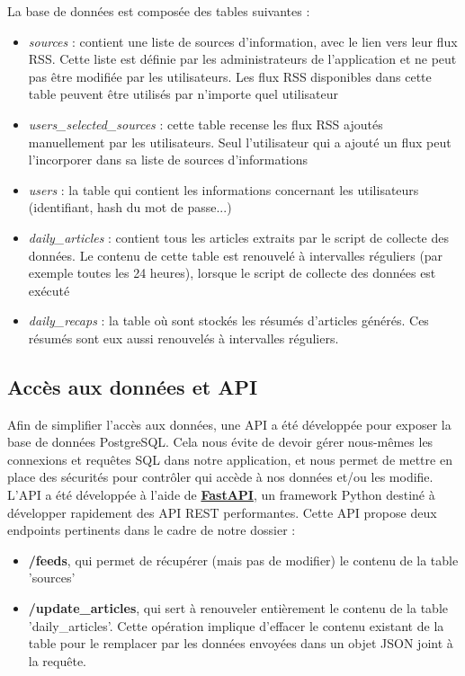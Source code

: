 \documentclass[french]{article}
\begin{document}
    La base de données est composée des tables suivantes :
    \begin{itemize}
        \item \textit{sources} : contient une liste de sources d'information, avec le lien vers leur flux RSS. Cette liste est définie par les administrateurs de l'application et ne peut pas être modifiée par les utilisateurs. Les flux RSS disponibles dans cette table peuvent être utilisés par n'importe quel utilisateur
        \item \textit{users\_selected\_sources} : cette table recense les flux RSS ajoutés manuellement par les utilisateurs. Seul l'utilisateur qui a ajouté un flux peut l'incorporer dans sa liste de sources d'informations
        \item \textit{users} : la table qui contient les informations concernant les utilisateurs (identifiant, hash du mot de passe...)
        \item \textit{daily\_articles} : contient tous les articles extraits par le script de collecte des données. Le contenu de cette table est renouvelé à intervalles réguliers (par exemple toutes les 24 heures), lorsque le script de collecte des données est exécuté
        \item \textit{daily\_recaps} : la table où sont stockés les résumés d'articles générés. Ces résumés sont eux aussi renouvelés à intervalles réguliers.
    \end{itemize}

    \subsection{Accès aux données et API}
    
    Afin de simplifier l'accès aux données, une API a été développée pour exposer la base de données PostgreSQL. Cela nous évite de devoir gérer nous-mêmes les connexions et requêtes SQL dans notre application, et nous permet de mettre en place des sécurités pour contrôler qui accède à nos données et/ou les modifie.
    L'API a été développée à l'aide de \textbf{\href{https://fastapi.tiangolo.com/}{FastAPI}}, un framework Python destiné à développer rapidement des API REST performantes. Cette API propose deux endpoints pertinents dans le cadre de notre dossier :
    \begin{itemize}
        \item \textbf{/feeds}, qui permet de récupérer (mais pas de modifier) le contenu de la table 'sources'
        \item \textbf{/update\_articles}, qui sert à renouveler entièrement le contenu de la table 'daily\_articles'. Cette opération implique d'effacer le contenu existant de la table pour le remplacer par les données envoyées dans un objet JSON joint à la requête.
    \end{itemize}
\end{document}
